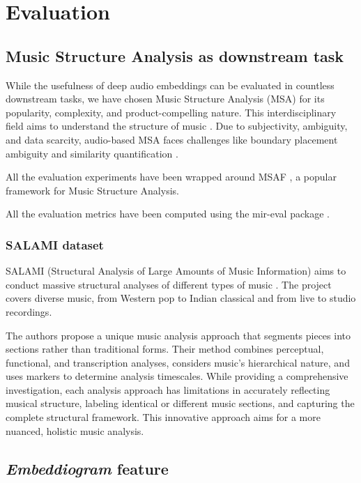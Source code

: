 \chapter{Evaluation}

\section{Music Structure Analysis as downstream task}

While the usefulness of deep audio embeddings can be evaluated in countless downstream tasks, we have chosen Music Structure Analysis (MSA) for its popularity, complexity, and product-compelling nature. This interdisciplinary field aims to understand the structure of music \cite{Nieto2020Audio-BasedApplications}. Due to subjectivity, ambiguity, and data scarcity, audio-based MSA faces challenges like boundary placement ambiguity and similarity quantification \cite{NietoPerceptualMusic}.  

All the evaluation experiments have been wrapped around MSAF \cite{NietoMSAF:FRAMEWORK}, a popular framework for Music Structure Analysis.

All the evaluation metrics have been computed using the mir-eval package \cite{RaffelMir_eval:METRICS}.

\subsection{SALAMI dataset}

SALAMI (Structural Analysis of Large Amounts of Music Information) aims to conduct massive structural analyses of different types of music \cite{Smith2011DESIGNANNOTATIONS}. The project covers diverse music, from Western pop to Indian classical and from live to studio recordings.

The authors propose a unique music analysis approach that segments pieces into sections rather than traditional forms. Their method combines perceptual, functional, and transcription analyses, considers music's hierarchical nature, and uses markers to determine analysis timescales. While providing a comprehensive investigation, each analysis approach has limitations in accurately reflecting musical structure, labeling identical or different music sections, and capturing the complete structural framework. This innovative approach aims for a more nuanced, holistic music analysis.

\section{\textit{Embeddiogram} feature}

